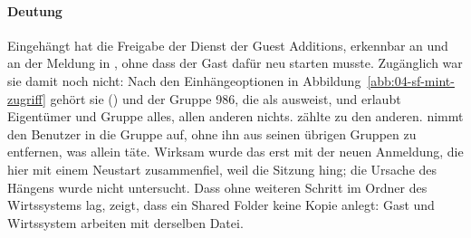 \begin{messung}
\paragraph{Deutung} Eingehängt hat die Freigabe der Dienst der Guest Additions, erkennbar an  und an der Meldung in , ohne dass der Gast dafür neu starten musste. Zugänglich war sie damit noch nicht: Nach den Einhängeoptionen in Abbildung~\ref{abb:04-sf-mint-zugriff} gehört sie  () und der Gruppe 986, die  als  ausweist, und  erlaubt Eigentümer und Gruppe alles, allen anderen nichts.  zählte zu den anderen.  nimmt den Benutzer in die Gruppe auf, ohne ihn aus seinen übrigen Gruppen zu entfernen, was  allein täte. Wirksam wurde das erst mit der neuen Anmeldung, die hier mit einem Neustart zusammenfiel, weil die Sitzung hing; die Ursache des Hängens wurde nicht untersucht. Dass  ohne weiteren Schritt im Ordner des Wirtssystems lag, zeigt, dass ein Shared Folder keine Kopie anlegt: Gast und Wirtssystem arbeiten mit derselben Datei.
\end{messung}

